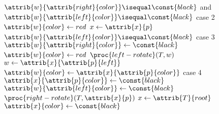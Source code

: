\documentclass[12pt]{article}
\begin{document}
\begin{codebox}
            \End
\li         \If $\attrib{w}{\attrib{right}{color}} \isequal \const{black}$ and $\attrib{w}{\attrib{left}{color}} \isequal \const{black}$ \Comment case 2
\li         \Then
                $\attrib{w}{color} \gets{red}$
\li             $x \gets{\attrib{x}{p}}$
\li         \Else
\li             \If $\attrib{w}{\attrib{left}{color}} \isequal \const{black}$ \Comment case 3
\li             \Then
                    $\attrib{w}{\attrib{right}{color}} \gets{\const{black}}$
\li                 $\attrib{w}{color} \gets{red}$
\li                 $\proc{left-rotate}(T, w)$
\li                 $w \gets{\attrib{x}{\attrib{p}{left}}}$
                \End
\li             $\attrib{w}{color} \gets{\attrib{x}{\attrib{p}{color}}}$ \Comment case 4
\li             $\attrib{x}{\attrib{p}{color}} \gets{\const{black}}$
\li             $\attrib{w}{\attrib{left}{color}} \gets{\const{black}}$
\li             $\proc{right-rotate}(T, \attrib{x}{p})$
\li             $x \gets{\attrib{T}{root}}$
            \End
        \End
    \End
\li $\attrib{x}{color} \gets{\const{black}}$
\end{codebox}
\end{document}
